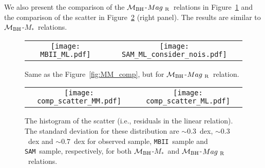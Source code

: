 \documentclass[twocolumn,trackchanges]{aastex63}
\newcommand{\mbh}{$\mathcal M_{\rm BH}$}
\newcommand{\mr}{$Mag_{\rm ~R}$}
\newcommand{\mstar}{{$M_*$}}
\newcommand{\sam}{\texttt{SAM}}
\newcommand{\mbii}{\texttt{MBII}}
\newcommand{\blue}[1]{{{#1}}}
\begin{document}

\blue{We also present the comparison of the \mbh-\mr\ relations in Figure~\ref{fig:ML_comp} and the comparison of the scatter in Figure~\ref{fig:offset_comp} (right panel). The results are similar to \mbh-\mstar\ relations.}

\begin{figure*}[t]%
\begin{tabular}{c c}
\texttt{[image: MBII\_ML.pdf]} &
\texttt{[image: SAM\_ML\_consider\_nois.pdf]} \\
\end{tabular}
\caption{Same as the Figure~\ref{fig:MM_comp}, but for \mbh-\mr\ relation.}
\label{fig:ML_comp}
\end{figure*}


\begin{figure*}[t]%
\begin{tabular}{c c}
\texttt{[image: comp\_scatter\_MM.pdf]} &
\texttt{[image: comp\_scatter\_ML.pdf]} \\
\end{tabular}
\caption{The histogram of the scatter (i.e., residuals in the linear relation). The standard deviation for these distribution are $\sim0.3$~dex, $\sim0.3$~dex and $\sim0.7$~dex for observed sample, \mbii\ sample and \sam\ sample, respectively, for both \mbh-\mstar\ and \mbh-\mr\ relations.
}
\label{fig:offset_comp}
\end{figure*}
\end{document}
